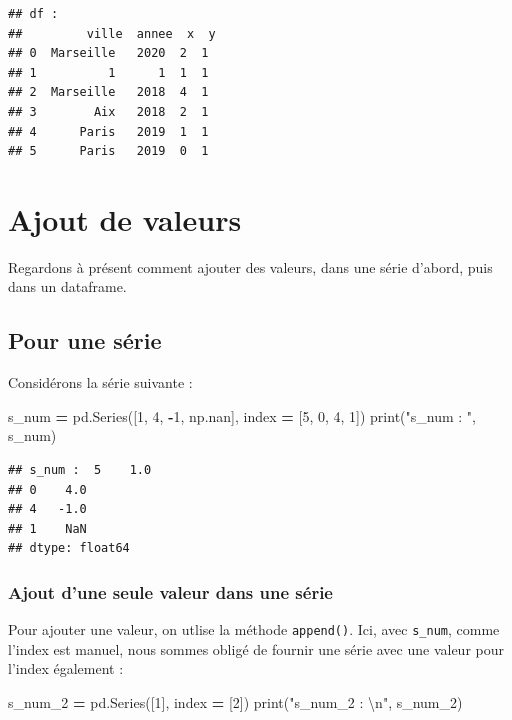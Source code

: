 \documentclass[12pt,]{book}
\newenvironment{Shaded}{\begin{snugshade}}{\end{snugshade}}
\newcommand{\DecValTok}[1]{\textcolor[rgb]{0.00,0.00,0.81}{#1}}
\newcommand{\CharTok}[1]{\textcolor[rgb]{0.31,0.60,0.02}{#1}}
\newcommand{\StringTok}[1]{\textcolor[rgb]{0.31,0.60,0.02}{#1}}
\newcommand{\OperatorTok}[1]{\textcolor[rgb]{0.81,0.36,0.00}{\textbf{#1}}}
\newcommand{\BuiltInTok}[1]{#1}
\newcommand{\NormalTok}[1]{#1}
\numberwithin{equation}{section}
\numberwithin{countremarque}{section}
\begin{document}
\begin{lstlisting}
## df : 
##         ville  annee  x  y
## 0  Marseille   2020  2  1
## 1          1      1  1  1
## 2  Marseille   2018  4  1
## 3        Aix   2018  2  1
## 4      Paris   2019  1  1
## 5      Paris   2019  0  1
\end{lstlisting}

\section{Ajout de valeurs}\label{pandas-ajout-valeurs}

Regardons à présent comment ajouter des valeurs, dans une série d'abord,
puis dans un dataframe.

\subsection{Pour une série}\label{pour-une-serie-1}

Considérons la série suivante :

\begin{Shaded}
\begin{Highlighting}[]
\NormalTok{s_num }\OperatorTok{=}\NormalTok{ pd.Series([}\DecValTok{1}\NormalTok{, }\DecValTok{4}\NormalTok{, }\OperatorTok{-}\DecValTok{1}\NormalTok{, np.nan],}
\NormalTok{             index }\OperatorTok{=}\NormalTok{ [}\DecValTok{5}\NormalTok{, }\DecValTok{0}\NormalTok{, }\DecValTok{4}\NormalTok{, }\DecValTok{1}\NormalTok{])}
\BuiltInTok{print}\NormalTok{(}\StringTok{"s_num : "}\NormalTok{, s_num)}
\end{Highlighting}
\end{Shaded}

\begin{lstlisting}
## s_num :  5    1.0
## 0    4.0
## 4   -1.0
## 1    NaN
## dtype: float64
\end{lstlisting}

\subsubsection{Ajout d'une seule valeur dans une
série}\label{ajout-dune-seule-valeur-dans-une-serie}

Pour ajouter une valeur, on utlise la méthode \texttt{append()}. Ici,
avec \texttt{s\_num}, comme l'index est manuel, nous sommes obligé de
fournir une série avec une valeur pour l'index également :

\begin{Shaded}
\begin{Highlighting}[]
\NormalTok{s_num_2 }\OperatorTok{=}\NormalTok{ pd.Series([}\DecValTok{1}\NormalTok{], index }\OperatorTok{=}\NormalTok{ [}\DecValTok{2}\NormalTok{])}
\BuiltInTok{print}\NormalTok{(}\StringTok{"s_num_2 : }\CharTok{\textbackslash{}n}\StringTok{"}\NormalTok{, s_num_2)}
\end{Highlighting}
\end{Shaded}
\end{document}
